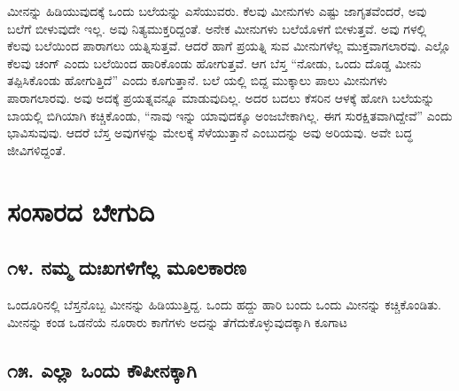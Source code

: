 ಮೀನನ್ನು ಹಿಡಿಯುವುದಕ್ಕೆ ಒಂದು ಬಲೆಯನ್ನು ಎಸೆಯುವರು. ಕೆಲವು ಮೀನುಗಳು ಎಷ್ಟು ಜಾಗೃತವೆಂದರೆ, ಅವು ಬಲೆಗೆ ಬೀಳುವುದೇ ಇಲ್ಲ. ಅವು ನಿತ್ಯಮುಕ್ತರಿದ್ದಂತೆ. ಅನೇಕ ಮೀನುಗಳು ಬಲೆಯೊಳಗೆ ಬೀಳುತ್ತವೆ. ಅವು ಗಳಲ್ಲಿ ಕೆಲವು ಬಲೆಯಿಂದ ಪಾರಾಗಲು ಯತ್ನಿಸುತ್ತವೆ. ಆದರೆ ಹಾಗೆ ಪ್ರಯತ್ನಿ ಸುವ ಮೀನುಗಳೆಲ್ಲ ಮುಕ್ತವಾಗಲಾರವು. ಎಲ್ಲೊ ಕೆಲವು ಚಂಗ್ ಎಂದು ಬಲೆಯಿಂದ ಹಾರಿಕೊಂಡು ಹೋಗುತ್ತವೆ. ಆಗ ಬೆಸ್ತ “ನೋಡು, ಒಂದು ದೊಡ್ಡ ಮೀನು ತಪ್ಪಿಸಿಕೊಂಡು ಹೋಗುತ್ತಿದೆ” ಎಂದು ಕೂಗುತ್ತಾನೆ. ಬಲೆ ಯಲ್ಲಿ ಬಿದ್ದ ಮುಕ್ಕಾಲು ಪಾಲು ಮೀನುಗಳು ಪಾರಾಗಲಾರವು. ಅವು ಅದಕ್ಕೆ ಪ್ರಯತ್ನವನ್ನೂ ಮಾಡುವುದಿಲ್ಲ. ಅದರ ಬದಲು ಕೆಸರಿನ ಆಳಕ್ಕೆ ಹೋಗಿ ಬಲೆಯನ್ನು ಬಾಯಲ್ಲಿ ಬಿಗಿಯಾಗಿ ಕಚ್ಚಿಕೊಂಡು, “ನಾವು ಇನ್ನು ಯಾವುದಕ್ಕೂ ಅಂಜಬೇಕಾಗಿಲ್ಲ. ಈಗ ಸುರಕ್ಷಿತವಾಗಿದ್ದೇವೆ” ಎಂದು ಭಾವಿಸುವುವು. ಆದರೆ ಬೆಸ್ತ ಅವುಗಳನ್ನು ಮೇಲಕ್ಕೆ ಸೆಳೆಯುತ್ತಾನೆ ಎಂಬುದನ್ನು ಅವು ಅರಿಯವು. ಅವೇ ಬದ್ಧ ಜೀವಿಗಳಿದ್ದಂತೆ.

\chapter{ಸಂಸಾರದ ಬೇಗುದಿ}

\section{\num{೧೪. } ನಮ್ಮ ದುಃಖಗಳಿಗೆಲ್ಲ ಮೂಲಕಾರಣ}

ಒಂದೂರಿನಲ್ಲಿ ಬೆಸ್ತನೊಬ್ಬ ಮೀನನ್ನು ಹಿಡಿಯುತ್ತಿದ್ದ. ಒಂದು ಹದ್ದು ಹಾರಿ ಬಂದು ಒಂದು ಮೀನನ್ನು ಕಚ್ಚಿಕೊಂಡಿತು. ಮೀನನ್ನು ಕಂಡ ಒಡನೆಯೆ ನೂರಾರು ಕಾಗೆಗಳು ಅದನ್ನು ತೆಗೆದುಕೊಳ್ಳುವುದಕ್ಕಾಗಿ ಕೂಗಾಟ



\section{\num{೧೫. } ಎಲ್ಲಾ ಒಂದು ಕೌಪೀನಕ್ಕಾಗಿ}

